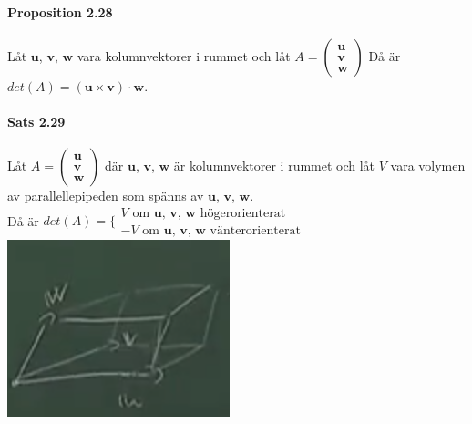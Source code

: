 \paragraph{Proposition 2.28} Låt $\bm{u}$, $\bm{v}$, $\bm{w}$ vara kolumnvektorer i rummet och låt $A=\begin{pmatrix}\bm{u}\\\bm{v}\\\bm{w}\end{pmatrix}$
Då är $det(A)=(\bm{u}\times \bm{v})\cdot \bm{w}$.

\paragraph{Sats 2.29} Låt $A=\begin{pmatrix}\bm{u}\\\bm{v}\\\bm{w}\end{pmatrix}$ där $\bm{u}$, $\bm{v}$, $\bm{w}$ är kolumnvektorer i rummet
och låt $V$ vara volymen av parallellepipeden som spänns av $\bm{u}$, $\bm{v}$, $\bm{w}$.\\
Då är $det(A)=\bigg\{ \begin{matrix}
    V\text{ om $\bm{u}$, $\bm{v}$, $\bm{w}$ högerorienterat}\\
    -V\text{ om $\bm{u}$, $\bm{v}$, $\bm{w}$ vänterorienterat}
\end{matrix}$\\
\includegraphics[scale=0.5]{imgs/22-02-07img01.png}

